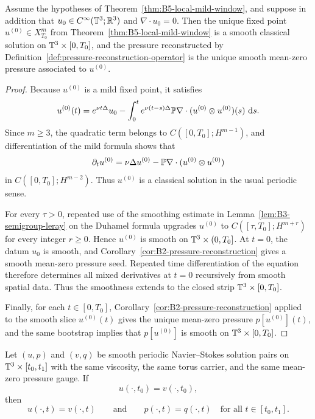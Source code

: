 \begin{manualproposition}
\label{prop:B6-classical-upgrade}
Assume the hypotheses of Theorem~\ref{thm:B5-local-mild-window}, and suppose in addition that
$u_0\in C^\infty(\mathbb{T}^3;\mathbb R^3)$ and $\nabla\cdot u_0=0$. Then the unique fixed point
$u^{(0)}\in X_{T_0}^m$ from Theorem~\ref{thm:B5-local-mild-window} is a smooth classical solution on
$\mathbb{T}^3\times[0,T_0]$, and the pressure reconstructed by Definition~\ref{def:pressure-reconstruction-operator}
is the unique smooth mean-zero pressure associated to $u^{(0)}$.
\end{manualproposition}

\begin{proof}
Because $u^{(0)}$ is a mild fixed point, it satisfies
\[
u^{(0)}(t)=e^{\nu t\Delta}u_0-\int_0^t e^{\nu(t-s)\Delta}\mathbb{P}\nabla\cdot(u^{(0)}\otimes u^{(0)})(s)\,\,\mathrm{d} s.
\]
Since $m\ge 3$, the quadratic term belongs to $C([0,T_0];H^{m-1})$, and differentiation of the
mild formula shows that
\[
\partial_t u^{(0)}=\nu\Delta u^{(0)}-\mathbb{P}\nabla\cdot(u^{(0)}\otimes u^{(0)})
\]
in $C([0,T_0];H^{m-2})$. Thus $u^{(0)}$ is a classical solution in the usual periodic sense.

For every $\tau>0$, repeated use of the smoothing estimate in Lemma~\ref{lem:B3-semigroup-leray}
on the Duhamel formula upgrades $u^{(0)}$ to $C([\tau,T_0];H^{m+r})$ for every integer $r\ge 0$.
Hence $u^{(0)}$ is smooth on $\mathbb{T}^3\times(0,T_0]$. At $t=0$, the datum $u_0$ is smooth, and
Corollary~\ref{cor:B2-pressure-reconstruction} gives a smooth mean-zero pressure seed. Repeated
time differentiation of the equation therefore determines all mixed derivatives at $t=0$ recursively
from smooth spatial data. Thus the smoothness extends to the closed strip
$\mathbb{T}^3\times[0,T_0]$.

Finally, for each $t\in[0,T_0]$, Corollary~\ref{cor:B2-pressure-reconstruction} applied to the
smooth slice $u^{(0)}(t)$ gives the unique mean-zero pressure $p[u^{(0)}](t)$, and the same
bootstrap implies that $p[u^{(0)}]$ is smooth on $\mathbb{T}^3\times[0,T_0]$.
\end{proof}

\begin{manualtheorem}
\label{thm:B7-overlap-uniqueness}
Let $(u,p)$ and $(v,q)$ be smooth periodic Navier--Stokes solution pairs on
$\mathbb{T}^3\times[t_0,t_1]$ with the same viscosity, the same torus carrier, and the same mean-zero
pressure gauge. If
\[
u(\cdot,t_0)=v(\cdot,t_0),
\]
then
\[
u(\cdot,t)=v(\cdot,t)
\qquad\text{and}\qquad
p(\cdot,t)=q(\cdot,t)
\quad\text{for all }t\in[t_0,t_1].
\]
\end{manualtheorem}


